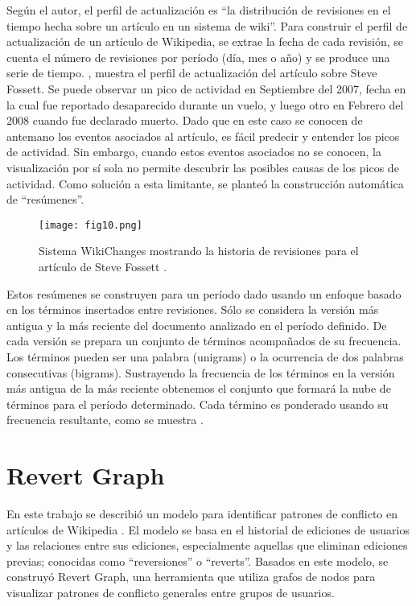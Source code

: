 Según el autor, el perfil de actualización es “la distribución de revisiones en el tiempo hecha sobre un artículo en un sistema de wiki”. Para construir el perfil de actualización de un artículo de Wikipedia, se extrae la fecha de cada revisión, se cuenta el número de revisiones por período (día, mes o año) y se produce una serie de tiempo.
, muestra el perfil de actualización del artículo sobre Steve Fossett. Se puede observar un pico de actividad en Septiembre del 2007, fecha en la cual fue reportado desaparecido durante un vuelo, y luego otro en Febrero del 2008 cuando fue declarado muerto. Dado que en este caso se conocen de antemano los eventos asociados al artículo, es fácil predecir y entender los picos de actividad. Sin embargo, cuando estos eventos asociados no se conocen, la visualización por sí sola no permite descubrir las posibles causas de los picos de actividad. Como solución a esta limitante, se planteó la construcción automática de “resúmenes”.

\begin{figure}[htp]
  \centering
  \texttt{[image: fig10.png]}
  \caption[Sistema WikiChanges mostrando la historia de revisiones para el artículo de Steve Fossett]{Sistema WikiChanges mostrando la historia de revisiones para el artículo de Steve Fossett \cite[Fig. 3]{Nun08}.}
  \label{fig:fig10}
\end{figure}

Estos resúmenes se construyen para un período dado usando un enfoque basado en los términos insertados entre revisiones. Sólo se considera la versión más antigua y la más reciente del documento analizado en el período definido. De cada versión se prepara un conjunto de términos acompañados de su frecuencia. Los términos pueden ser una palabra (unigrams) o  la ocurrencia de dos palabras consecutivas (bigrams). Sustrayendo la frecuencia de los términos en la versión más antigua de la más reciente obtenemos el conjunto que formará la nube de términos para el período determinado. Cada término es ponderado usando su frecuencia resultante, como se muestra .

\section{Revert Graph}
En este trabajo se describió un modelo para identificar patrones de conflicto en artículos de Wikipedia \cite{Suh07}. El modelo se basa en el historial de ediciones de usuarios y las relaciones entre sus ediciones, especialmente aquellas que eliminan ediciones previas; conocidas como “reversiones” o “reverts”. Basados en este modelo, se construyó Revert Graph, una herramienta que utiliza grafos de nodos para visualizar patrones de conflicto generales entre grupos de usuarios.

